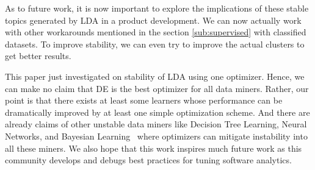 \documentclass[10pt,conference]{IEEEtran}
\theoremstyle{break}
\begin{document}
As to future work, it is now important to explore the implications of these stable topics generated by LDA in a product development. We can now actually work with other workarounds mentioned in the section \ref{sub:supervised} with classified datasets. To improve stability, we can even try to improve the actual clusters to get better results.

This paper just investigated on stability of LDA using one optimizer. Hence, we can make no claim that DE is the best optimizer for all data miners. Rather, our point is that there exists at least some learners whose performance can be dramatically improved by at least one simple optimization scheme. And there are already claims of other unstable data miners like Decision Tree Learning, Neural Networks, and Bayesian Learning~\cite{zhang2005machine} where optimizers can mitigate instability into all these miners. We also hope that this work inspires much future work as this community develops and debugs best practices for tuning software analytics.



\medskip



\end{document}
